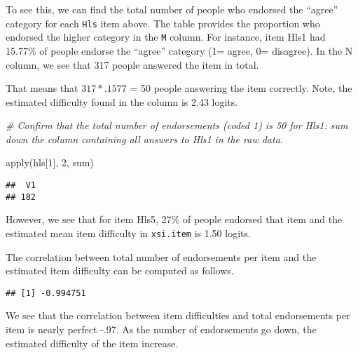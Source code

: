 \documentclass[
]{book}
\newenvironment{Shaded}{\begin{snugshade}}{\end{snugshade}}
\newcommand{\AttributeTok}[1]{\textcolor[rgb]{0.77,0.63,0.00}{#1}}
\newcommand{\CommentTok}[1]{\textcolor[rgb]{0.56,0.35,0.01}{\textit{#1}}}
\newcommand{\DecValTok}[1]{\textcolor[rgb]{0.00,0.00,0.81}{#1}}
\newcommand{\FunctionTok}[1]{\textcolor[rgb]{0.00,0.00,0.00}{#1}}
\newcommand{\NormalTok}[1]{#1}
\newcommand{\OtherTok}[1]{\textcolor[rgb]{0.56,0.35,0.01}{#1}}
\newcommand{\SpecialCharTok}[1]{\textcolor[rgb]{0.00,0.00,0.00}{#1}}
\begin{document}
To see this, we can find the total number of people who endorsed the ``agree'' category for each \texttt{Hls} item above. The table provides the proportion who endorsed the higher category in the \texttt{M} column. For instance, item Hls1 had 15.77\% of people endorse the ``agree'' category (1= agree, 0= disagree). In the N column, we see that 317 people answered the item in total.

That means that \(317*.1577\) = 50 people answering the item correctly. Note, the estimated difficulty found in the column is 2.43 logits.

\begin{Shaded}
\begin{Highlighting}[]
\CommentTok{\# Confirm that the total number of endorsements (coded 1) is 50 for Hls1: sum down the column containing all answers to Hls1 in the raw data.}


\FunctionTok{apply}\NormalTok{(hls[}\DecValTok{1}\NormalTok{], }\DecValTok{2}\NormalTok{, sum)}
\end{Highlighting}
\end{Shaded}

\begin{verbatim}
##  V1 
## 182
\end{verbatim}

However, we see that for item Hls5, 27\% of people endorsed that item and the estimated mean item difficulty in \texttt{xsi.item} is 1.50 logits.

The correlation between total number of endorsements per item and the estimated item difficulty can be computed as follows.

\begin{Shaded}
\end{Shaded}

\begin{verbatim}
## [1] -0.994751
\end{verbatim}

We see that the correlation between item difficulties and total endorsements per item is nearly perfect -.97. As the number of endorsements go down, the estimated difficulty of the item increase.
\end{document}
